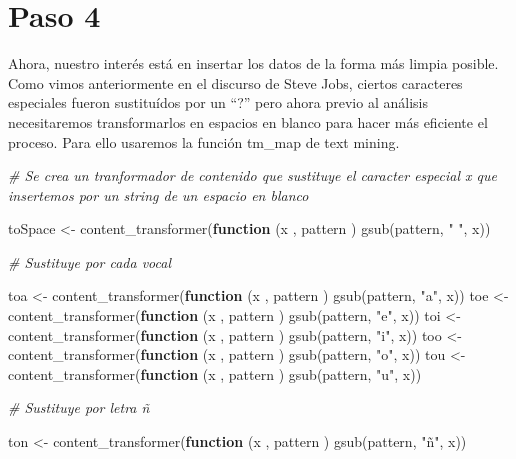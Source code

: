\documentclass[
]{article}
\newenvironment{Shaded}{\begin{snugshade}}{\end{snugshade}}
\newcommand{\CommentTok}[1]{\textcolor[rgb]{0.56,0.35,0.01}{\textit{#1}}}
\newcommand{\ControlFlowTok}[1]{\textcolor[rgb]{0.13,0.29,0.53}{\textbf{#1}}}
\newcommand{\FunctionTok}[1]{\textcolor[rgb]{0.00,0.00,0.00}{#1}}
\newcommand{\NormalTok}[1]{#1}
\newcommand{\OtherTok}[1]{\textcolor[rgb]{0.56,0.35,0.01}{#1}}
\newcommand{\StringTok}[1]{\textcolor[rgb]{0.31,0.60,0.02}{#1}}
\begin{document}
\hypertarget{paso-4}{%
\section{Paso 4}\label{paso-4}}

Ahora, nuestro interés está en insertar los datos de la forma más limpia
posible. Como vimos anteriormente en el discurso de Steve Jobs, ciertos
caracteres especiales fueron sustituídos por un ``?'' pero ahora previo
al análisis necesitaremos transformarlos en espacios en blanco para
hacer más eficiente el proceso. Para ello usaremos la función tm\_map de
text mining.

\begin{Shaded}
\begin{Highlighting}[]
\CommentTok{\# Se crea un tranformador de contenido que sustituye el caracter especial x que insertemos por un string de un espacio en blanco}

\NormalTok{toSpace }\OtherTok{\textless{}{-}} \FunctionTok{content\_transformer}\NormalTok{(}\ControlFlowTok{function}\NormalTok{ (x , pattern ) }\FunctionTok{gsub}\NormalTok{(pattern, }\StringTok{" "}\NormalTok{, x))}

\CommentTok{\# Sustituye por cada vocal}

\NormalTok{toa }\OtherTok{\textless{}{-}} \FunctionTok{content\_transformer}\NormalTok{(}\ControlFlowTok{function}\NormalTok{ (x , pattern ) }\FunctionTok{gsub}\NormalTok{(pattern, }\StringTok{"a"}\NormalTok{, x)) }
\NormalTok{toe }\OtherTok{\textless{}{-}} \FunctionTok{content\_transformer}\NormalTok{(}\ControlFlowTok{function}\NormalTok{ (x , pattern ) }\FunctionTok{gsub}\NormalTok{(pattern, }\StringTok{"e"}\NormalTok{, x)) }
\NormalTok{toi }\OtherTok{\textless{}{-}} \FunctionTok{content\_transformer}\NormalTok{(}\ControlFlowTok{function}\NormalTok{ (x , pattern ) }\FunctionTok{gsub}\NormalTok{(pattern, }\StringTok{"i"}\NormalTok{, x))}
\NormalTok{too }\OtherTok{\textless{}{-}} \FunctionTok{content\_transformer}\NormalTok{(}\ControlFlowTok{function}\NormalTok{ (x , pattern ) }\FunctionTok{gsub}\NormalTok{(pattern, }\StringTok{"o"}\NormalTok{, x)) }
\NormalTok{tou }\OtherTok{\textless{}{-}} \FunctionTok{content\_transformer}\NormalTok{(}\ControlFlowTok{function}\NormalTok{ (x , pattern ) }\FunctionTok{gsub}\NormalTok{(pattern, }\StringTok{"u"}\NormalTok{, x)) }

\CommentTok{\# Sustituye por letra ñ}

\NormalTok{ton }\OtherTok{\textless{}{-}} \FunctionTok{content\_transformer}\NormalTok{(}\ControlFlowTok{function}\NormalTok{ (x , pattern ) }\FunctionTok{gsub}\NormalTok{(pattern, }\StringTok{"ñ"}\NormalTok{, x)) }


\end{Highlighting}
\end{Shaded}
\end{document}
